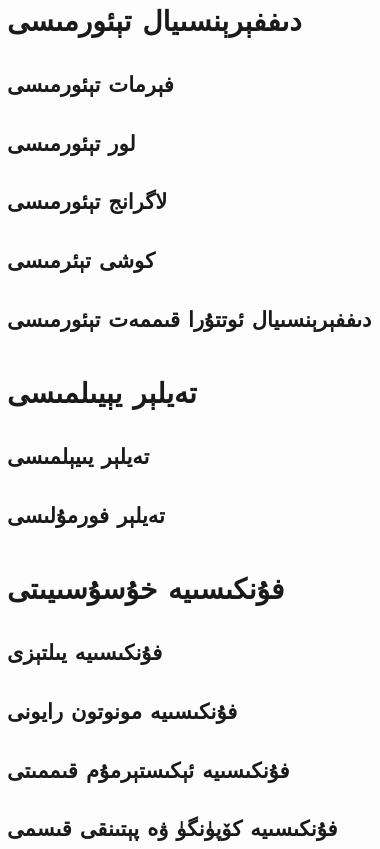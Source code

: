\section{دىففېرېنسىيال تېئورمىسى}
\subsection{فېرمات تېئورمىسى}
\subsection{لور تېئورمىسى}
\subsection{لاگرانج تېئورمىسى}
\subsection{كوشى تېئرمىسى}
\subsection{دىففېرېنسىيال ئوتتۇرا قىممەت تېئورمىسى}

\section{تەيلېر يېيىلمىسى}
\subsection{تەيلېر يىيېلمىسى}
\subsection{تەيلېر فورمۇلىسى}

\section{فۇنكىسىيە خۇسۇسىيىتى}
\subsection{فۇنكىسىيە يىلتېزى}
\subsection{فۇنكىسىيە مونوتون رايونى}
\subsection{فۇنكىسىيە ئېكىستېرمۇم قىممىتى}
\subsection{فۇنكىسىيە كۆپۈنگۈ ۋە پېتىنقى قىسمى}
